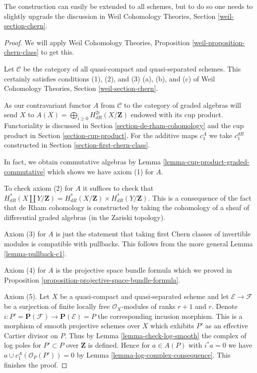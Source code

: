 \noindent
The construction can easily be extended to all schemes, but to do so one needs
to slightly upgrade the discussion in Weil Cohomology Theories,
Section \ref{weil-section-chern}.

\begin{proof}
We will apply Weil Cohomology Theories, Proposition
\ref{weil-proposition-chern-class} to get this.

\medskip\noindent
Let $\mathcal{C}$ be the category of all quasi-compact and quasi-separated
schemes. This certainly satisfies conditions
(1), (2), and (3) (a), (b), and (c) of  Weil Cohomology Theories,
Section \ref{weil-section-chern}.

\medskip\noindent
As our contravariant functor $A$ from $\mathcal{C}$ to the
category of graded algebras will send $X$ to
$A(X) = \bigoplus_{i \geq 0} H_{dR}^{2i}(X/\mathbf{Z})$
endowed with its cup product.
Functoriality is discussed in Section \ref{section-de-rham-cohomology}
and the cup product in Section \ref{section-cup-product}.
For the additive maps $c_1^A$ we take $c_1^{dR}$ constructed
in Section \ref{section-first-chern-class}.

\medskip\noindent
In fact, we obtain commutative algebras by
Lemma \ref{lemma-cup-product-graded-commutative}
which shows we have axiom (1) for $A$.

\medskip\noindent
To check axiom (2) for $A$ it suffices to check that
$H^*_{dR}(X \coprod Y/\mathbf{Z}) =  H^*_{dR}(X/\mathbf{Z}) \times
H^*_{dR}(Y/\mathbf{Z})$.
This is a consequence of the fact that de Rham cohomology
is constructed by taking the cohomology of a sheaf of differential
graded algebras (in the Zariski topology).

\medskip\noindent
Axiom (3) for $A$ is just the statement that taking first Chern
classes of invertible modules is compatible with pullbacks.
This follows from the more general Lemma \ref{lemma-pullback-c1}.

\medskip\noindent
Axiom (4) for $A$ is the projective space bundle formula which
we proved in Proposition \ref{proposition-projective-space-bundle-formula}.

\medskip\noindent
Axiom (5).  Let $X$ be a quasi-compact and quasi-separated scheme and
let $\mathcal{E} \to \mathcal{F}$ be a surjection of finite locally free
$\mathcal{O}_X$-modules of ranks $r + 1$ and $r$. Denote
$i : P' = \mathbf{P}(\mathcal{F}) \to \mathbf{P}(\mathcal{E}) = P$ the
corresponding incusion morphism. This is a morphism of smooth projective
schemes over $X$ which exhibits $P'$ as an effective Cartier divisor on $P$.
Thus by Lemma \ref{lemma-check-log-smooth} the complex of log poles
for $P' \subset P$ over $\mathbf{Z}$ is defined.
Hence for $a \in A(P)$ with $i^*a = 0$ we have
$a \cup c_1^A(\mathcal{O}_P(P')) = 0$ by
Lemma \ref{lemma-log-complex-consequence}.
This finishes the proof.
\end{proof}


